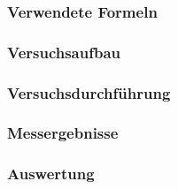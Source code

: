\documentclass[12pt,a4paper]{article}
\begin{document}
\subsubsection*{Verwendete Formeln}
\subsubsection*{Versuchsaufbau}
\subsubsection*{Versuchsdurchführung}

\subsubsection*{Messergebnisse}
\subsubsection*{Auswertung}
\end{document}
